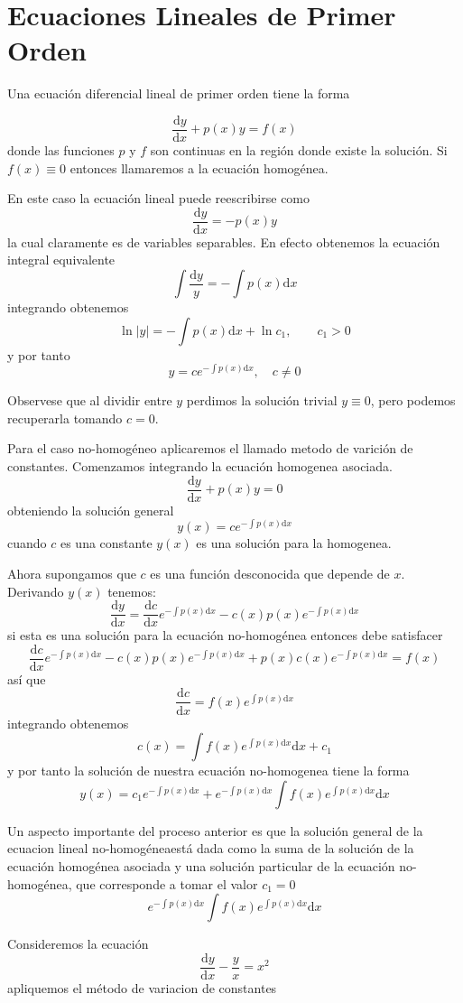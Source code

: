 \section{Ecuaciones Lineales de Primer Orden}

Una ecuación diferencial lineal de primer orden tiene la forma

$$
\frac{\mathrm{d}y}{\mathrm{d}x}+p(x)y=f(x)
$$
donde las funciones $p$ y $f$ son continuas en la región donde existe la solución. Si $f(x)\equiv0$ entonces llamaremos a la ecuación homogénea.

En este caso la ecuación lineal puede reescribirse como
$$
\frac{\mathrm{d}y}{\mathrm{d}x}=-p(x)y
$$
la cual claramente es de variables separables. En efecto obtenemos la ecuación integral equivalente 
$$
\int\frac{\mathrm{d}y}{y}=-\int p(x)\mathrm{d}x
$$
integrando obtenemos
$$
\ln |y|=-\int p(x)\mathrm{d}x+\ln c_1,\qquad c_1>0
$$
y por tanto
$$
y=ce^{-\int p(x)\mathrm{d}x}, \quad c\neq 0
$$

Observese que al dividir entre $y$ perdimos la solución trivial $y\equiv 0$, pero podemos recuperarla tomando $c=0$.

Para el caso no-homogéneo aplicaremos el llamado metodo de varición de constantes. Comenzamos integrando la ecuación homogenea asociada.
$$
\frac{\mathrm{d}y}{\mathrm{d}x}+p(x)y=0
$$
obteniendo la solución general
$$
y(x)=ce^{-\int p(x)\mathrm{d}x}
$$
cuando $c$ es una constante $y(x)$ es una solución para la homogenea. 

Ahora supongamos que $c$ es una función desconocida que depende de $x$. Derivando $y(x)$ tenemos:
$$
\frac{\mathrm{d}y}{\mathrm{d}x}=\frac{\mathrm{d}c}{\mathrm{d}x}e^{-\int p(x)\mathrm{d}x}-c(x)p(x)e^{-\int p(x)\mathrm{d}x}
$$
si esta es una solución para la ecuación no-homogénea entonces debe satisfacer
$$
\frac{\mathrm{d}c}{\mathrm{d}x}e^{-\int p(x)\mathrm{d}x}-c(x)p(x)e^{-\int p(x)\mathrm{d}x}+p(x)c(x)e^{-\int p(x)\mathrm{d}x}=f(x)
$$
así que
$$
\frac{\mathrm{d}c}{\mathrm{d}x}=f(x)e^{\int p(x)\mathrm{d}x}
$$
integrando obtenemos
$$
c(x)=\int f(x)e^{\int p(x)\mathrm{d}x}\mathrm{d}x+c_1
$$
y por tanto la solución de nuestra ecuación no-homogenea tiene la forma
$$
y(x)=c_1e^{-\int p(x)\mathrm{d}x}+e^{-\int p(x)\mathrm{d}x}\int f(x)e^{\int p(x)\mathrm{d}x}\mathrm{d}x
$$

Un aspecto importante del proceso anterior es que la solución general de la ecuacion lineal no-homogéneaestá dada como la suma de la solución de la ecuación homogénea asociada y una solución particular de la ecuación no-homogénea, que corresponde a tomar el valor $c_1=0$
$$
e^{-\int p(x)\mathrm{d}x}\int f(x)e^{\int p(x)\mathrm{d}x}\mathrm{d}x
$$

\begin{ejemplo}
 Consideremos la ecuación
 $$
 \frac{\mathrm{d}y}{\mathrm{d}x}-\frac{y}{x}=x^2
 $$
 apliquemos el método de variacion de constantes
 
\end{ejemplo}

